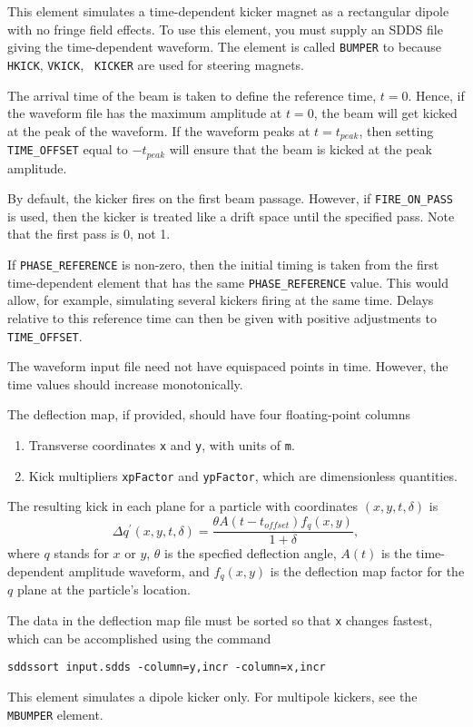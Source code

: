 This element simulates a time-dependent kicker magnet as a rectangular
dipole with no fringe field effects.  To use this element, you must
supply an SDDS file giving the time-dependent waveform.  The element
is called {\tt BUMPER} to because {\tt HKICK}, {\tt VKICK}, {\tt
KICKER} are used for steering magnets.

The arrival time of the beam is taken to define the reference time,
$t=0$.  Hence, if the waveform file has the maximum amplitude at
$t=0$, the beam will get kicked at the peak of the waveform.  If the waveform
peaks at $t=t_{peak}$, then setting \verb|TIME_OFFSET| equal to $-t_{peak}$
will ensure that the beam is kicked at the peak amplitude.

By default, the kicker fires on the first beam passage.  However, if 
\verb|FIRE_ON_PASS| is used, then the kicker is treated like a drift space until
the specified pass.
Note that the first pass is 0, not 1.

If \verb|PHASE_REFERENCE| is non-zero, then the initial timing is
taken from the first time-dependent element that has the same
\verb|PHASE_REFERENCE| value.  This would allow, for example,
simulating several kickers firing at the same time.  Delays relative
to this reference time can then be given with positive adjustments to
\verb|TIME_OFFSET|.

The waveform input file need not have equispaced points in time.  However, the
time values should increase monotonically.

The deflection map, if provided, should have four floating-point columns
\begin{enumerate}
\item Transverse coordinates \verb|x| and \verb|y|, with units of \verb|m|.
\item Kick multipliers \verb|xpFactor| and \verb|ypFactor|, which are dimensionless quantities.
\end{enumerate}
The resulting kick in each plane for a particle with coordinates $(x, y, t, \delta)$ is 
\begin{equation}
\Delta q^\prime (x, y, t, \delta) = \frac{\theta A(t-t_{offset}) f_q(x, y)}{1 + \delta},
\end{equation}
where $q$ stands for $x$ or $y$, $\theta$ is the specfied deflection angle, 
$A(t)$ is the time-dependent amplitude waveform, and $f_q(x, y)$ is the
deflection map factor for the $q$ plane at the particle's location.

The data in the deflection map file must be sorted so that \verb|x| changes fastest, which can be accomplished using
the command
\begin{verbatim}
sddssort input.sdds -column=y,incr -column=x,incr 
\end{verbatim}

This element simulates a dipole kicker only.  For multipole kickers, see the
{\tt MBUMPER} element.